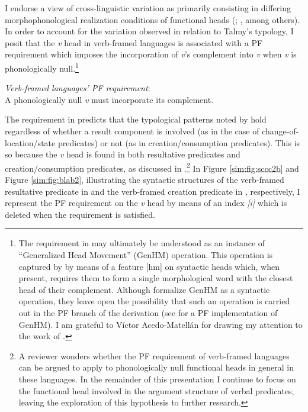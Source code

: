 \documentclass[output=paper,colorlinks,citecolor=brown]{langscibook}
\begin{document}
I endorse a view of cross-linguistic variation as primarily consisting in differing morphophonological realization conditions of functional heads (\citealt{Acedo-Matellan2016}; \citealt{Mateu2017}, among others). In order to account for the variation observed in relation to Talmy's typology, I posit that the \textit{v} head in verb-framed languages is associated with a PF requirement which imposes the incorporation of \textit{v}'s complement into \textit{v} when \textit{v} is phonologically null.\footnote{The requirement in  may ultimately be understood as an instance of  ``Generalized Head Movement'' (GenHM) operation. This operation is captured by \citet{ArregiAndPietraszko2021} by means of a feature [hm] on syntactic heads which, when present, requires them to form a single morphological word with the closest head of their complement. Although \citet{ArregiAndPietraszko2021} formalize GenHM as a syntactic operation, they leave open the possibility that such an operation is carried out in the PF branch of the derivation (see \citealt{big:Kwapiszewski2022} for a PF implementation of GenHM). I am grateful to Víctor Acedo-Matellán for drawing my attention to the work of \citet{ArregiAndPietraszko2021}.}

\ea \label{PFrequirement} \textit{Verb-framed languages' PF requirement}:\\ A phonologically null \textit{v} must incorporate its complement. \z

\noindent The requirement in  predicts that the typological patterns noted by \citeauthor{Talmy2000} hold regardless of whether a result component is involved (as in the case of change-of-location/state predicates) or not (as in creation/consumption predicates). This is so because the \textit{v} head is found in both resultative predicates and creation/consumption predicates, as discussed in .\footnote{A reviewer wonders whether the PF requirement of verb-framed languages can be argued to apply to phonologically null functional heads in general in these languages. In the remainder of this presentation I continue to focus on the functional head involved in the argument structure of verbal predicates, leaving the exploration of this hypothesis to further research.} In Figure \ref{sim:fig:sccc2b} and Figure \ref{sim:fig:blab2}, illustrating the syntactic structures of the verb-framed resultative predicate in  and the verb-framed creation predicate in , respectively, I represent the PF requirement on the \textit{v} head by means of an index \textit{[i]} which is deleted when the requirement is satisfied.
\end{document}
